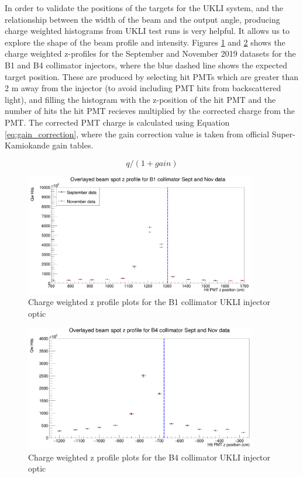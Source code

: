 In order to validate the positions of the targets for the UKLI system, and the relationship between the width of the beam and the output angle, producing charge weighted histograms from UKLI test runs is very helpful. It allows us to explore the shape of the beam profile and intensity. Figures \ref{fig:charge_weighted_nov_sept_B1} and \ref{fig:charge_weighted_nov_sept_B4} shows the charge weighted z-profiles for the September and November 2019 datasets for the B1 and B4 collimator injectors, where the blue dashed line shows the expected target position. These are produced by selecting hit PMTs which are greater than 2 m away from the injector (to avoid including PMT hits from backscattered light), and filling the histogram with the z-position of the hit PMT and the number of hits the hit PMT recieves multiplied by the corrected charge from the PMT. The corrected PMT charge is calculated using Equation \ref{eq:gain_correction}, where the gain correction value is taken from official Super-Kamiokande gain tables. 

\begin{equation}
    q/(1 + gain)
\label{eq:gain_correction}
\end{equation}

\begin{figure}
    \centering
    \includegraphics[width=0.9\textwidth]{Figures/charge_weighted_nov_sept_B1.PNG}
    \caption{Charge weighted z profile plots for the B1 collimator UKLI injector optic}
    \label{fig:charge_weighted_nov_sept_B1}
\end{figure}

\begin{figure}
    \centering
    \includegraphics[width=0.9\textwidth]{Figures/charge_weighted_nov_sept_B4.PNG}
    \caption{Charge weighted z profile plots for the B4 collimator UKLI injector optic}
    \label{fig:charge_weighted_nov_sept_B4}
\end{figure}

